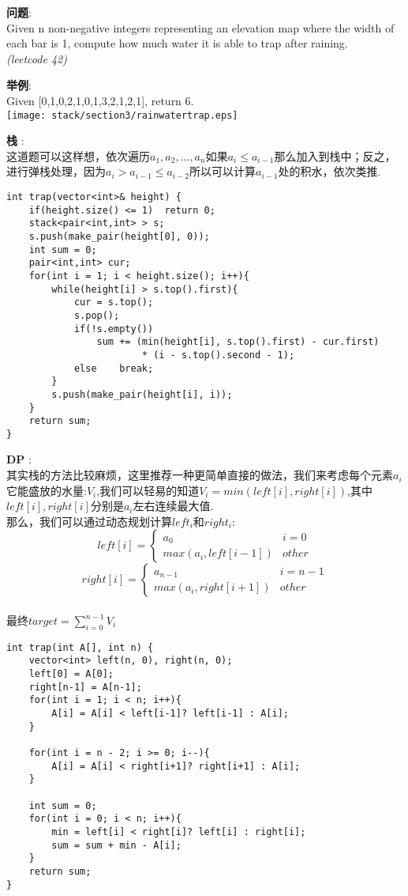     
\begin{description}
    \item{\textbf{问题}}:\\
Given n non-negative integers representing an elevation map where the width of each bar is 1, compute how much water it is able to trap after raining.\\
\textit{(leetcode 42)}
    \item{\textbf{举例}}:\\
Given [0,1,0,2,1,0,1,3,2,1,2,1], return 6. \\
\texttt{[image: stack/section3/rainwatertrap.eps]}
    \item{\textbf{栈}} : 
    \\这道题可以这样想，依次遍历$a_1, a_2, ..., a_n$如果$a_i \le a_{i-1}$那么加入到栈中；反之，进行弹栈处理，因为$a_i > a_{i-1} \le a_{i-2}$所以可以计算$a_{i-1}$处的积水，依次类推.
    \begin{lstlisting}
int trap(vector<int>& height) {
	if(height.size() <= 1)	return 0;
	stack<pair<int,int> > s;
	s.push(make_pair(height[0], 0));
	int sum = 0;
	pair<int,int> cur;
	for(int i = 1; i < height.size(); i++){
		while(height[i] > s.top().first){
			cur = s.top();
			s.pop();
			if(!s.empty())	
				sum += (min(height[i], s.top().first) - cur.first) 
						* (i - s.top().second - 1);
			else	break;
		}
		s.push(make_pair(height[i], i));
	}
	return sum;
}
    \end{lstlisting}
    \item{\textbf{DP}} : 
    \\其实栈的方法比较麻烦，这里推荐一种更简单直接的做法，我们来考虑每个元素$a_i$它能盛放的水量:$V_i$,我们可以轻易的知道$V_i = min(left[i], right[i])$,其中$left[i],right[i]$分别是$a_i$左右连续最大值.
	\\那么，我们可以通过动态规划计算$left_i和right_i$:
$$
left[i] =
\begin{cases} 
a_0 & i = 0 \\
max(a_i, left[i-1]) & other
\end{cases}
$$
$$
right[i] =
\begin{cases} 
a_{n-1} & i = n-1 \\
max(a_i, right[i+1]) & other
\end{cases}
$$
	\\最终$target = \sum_{i=0}^{n-1}V_i$
    \begin{lstlisting}
int trap(int A[], int n) {
	vector<int> left(n, 0), right(n, 0);
	left[0] = A[0];
	right[n-1] = A[n-1];
	for(int i = 1; i < n; i++){
		A[i] = A[i] < left[i-1]? left[i-1] : A[i];
	}

	for(int i = n - 2; i >= 0; i--){
		A[i] = A[i] < right[i+1]? right[i+1] : A[i];
	}

	int sum = 0;
	for(int i = 0; i < n; i++){
		min = left[i] < right[i]? left[i] : right[i];
		sum = sum + min - A[i];
	}
	return sum;
}
    \end{lstlisting}
\end{description}
